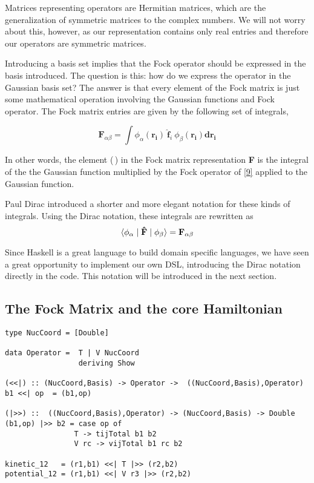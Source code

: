 \documentclass{tmr}
\begin{document}
\par Matrices representing operators are Hermitian matrices, which are the generalization
of symmetric matrices to the complex numbers. We will not worry about this, however, as our representation
contains only real entries and therefore our operators are symmetric matrices.

Introducing a basis set implies that the Fock operator should be expressed in the
basis introduced. The question is this: how do we express the operator in the Gaussian basis set?
The answer is that every element of the Fock matrix is just some mathematical operation
involving the Gaussian functions and Fock operator. The Fock matrix entries are given
by the following set of integrals,

\[\mathbf{F}_{\alpha \beta} =\int{\phi_{\alpha}(\mathbf{r_{i}})\: \mathbf{\hat f}_{i}\: \phi_{\beta}(\mathbf{r_{i}}) \mathbf{dr_{i}}} \]

In other words, the element (\textalpha\,\textbeta) in the Fock matrix representation \textbf{F} is
the integral of the the \textalpha Gaussian function multiplied by the Fock operator
of \eqref{9} applied to the \textbeta Gaussian function.

Paul Dirac introduced a shorter and more elegant notation for 
these kinds of integrals. Using the Dirac notation, these integrals are rewritten as
\begin{equation}\label{14}
 \braket{\phi_{\alpha} \mid \mathbf{\hat F} \mid  \phi_{\beta}}  = \mathbf{F}_{\alpha \beta} 
\end{equation}

Since Haskell is a great language to build domain specific languages, we have seen 
a great opportunity to implement our own DSL, introducing the Dirac notation directly in the code.
This notation will be introduced in the next section.


\subsection{The Fock Matrix and the core Hamiltonian}
\begin{lstlisting}[float,captionpos=b,belowcaptionskip=4pt, caption= Operators definition]
type NucCoord = [Double]

data Operator =  T | V NucCoord
                 deriving Show

(<<|) :: (NucCoord,Basis) -> Operator ->  ((NucCoord,Basis),Operator)
b1 <<| op  = (b1,op)

(|>>) ::  ((NucCoord,Basis),Operator) -> (NucCoord,Basis) -> Double
(b1,op) |>> b2 = case op of
                T -> tijTotal b1 b2
                V rc -> vijTotal b1 rc b2

kinetic_12   = (r1,b1) <<| T |>> (r2,b2)
potential_12 = (r1,b1) <<| V r3 |>> (r2,b2)
\end{lstlisting}
\end{document}
